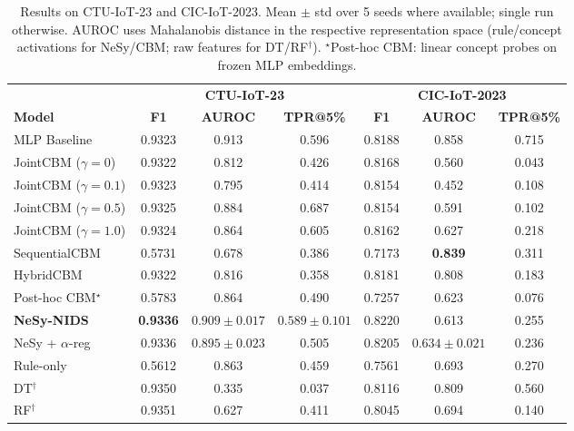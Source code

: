 \documentclass[journal]{IEEEtran}
\begin{document}
\begin{table}[!t]
\renewcommand{\arraystretch}{1.15}
\caption{Results on CTU-IoT-23 and CIC-IoT-2023. Mean $\pm$ std over 5
  seeds where available; single run otherwise. AUROC uses Mahalanobis
  distance in the respective representation space (rule/concept
  activations for NeSy/CBM; raw features for DT/RF$^\dagger$).
  $^\star$Post-hoc CBM: linear concept probes on frozen MLP embeddings.}
\label{tab:main}
\centering
\small
\begin{tabular}{lcccccc}
\toprule
& \multicolumn{3}{c}{\textbf{CTU-IoT-23}} &
  \multicolumn{3}{c}{\textbf{CIC-IoT-2023}} \\
\cmidrule(lr){2-4}\cmidrule(lr){5-7}
\textbf{Model} & \textbf{F1} & \textbf{AUROC} & \textbf{TPR@5\%} &
                 \textbf{F1} & \textbf{AUROC} & \textbf{TPR@5\%} \\
\midrule
MLP Baseline
  & 0.9323 & 0.913 & 0.596
  & 0.8188 & 0.858 & 0.715 \\
\midrule
JointCBM ($\gamma{=}0$)
  & 0.9322 & 0.812 & 0.426
  & 0.8168 & 0.560 & 0.043 \\
JointCBM ($\gamma{=}0.1$)
  & 0.9323 & 0.795 & 0.414
  & 0.8154 & 0.452 & 0.108 \\
JointCBM ($\gamma{=}0.5$)
  & 0.9325 & 0.884 & 0.687
  & 0.8154 & 0.591 & 0.102 \\
JointCBM ($\gamma{=}1.0$)
  & 0.9324 & 0.864 & 0.605
  & 0.8162 & 0.627 & 0.218 \\
SequentialCBM
  & 0.5731 & 0.678 & 0.386
  & 0.7173 & \textbf{0.839} & 0.311 \\
HybridCBM
  & 0.9322 & 0.816 & 0.358
  & 0.8181 & 0.808 & 0.183 \\
Post-hoc CBM$^\star$
  & 0.5783 & 0.864 & 0.490
  & 0.7257 & 0.623 & 0.076 \\
\midrule
\textbf{NeSy-NIDS}
  & \textbf{0.9336} & $\mathbf{0.909\pm0.017}$ & $0.589\pm0.101$
  & $\mathbf{0.8220}$ & 0.613 & 0.255 \\
NeSy + $\alpha$-reg
  & 0.9336 & $0.895\pm0.023$ & 0.505
  & 0.8205 & $0.634\pm0.021$ & 0.236 \\
Rule-only
  & 0.5612 & 0.863 & 0.459
  & 0.7561 & 0.693 & 0.270 \\
\midrule
DT$^\dagger$
  & 0.9350 & 0.335 & 0.037
  & 0.8116 & 0.809 & 0.560 \\
RF$^\dagger$
  & 0.9351 & 0.627 & 0.411
  & 0.8045 & 0.694 & 0.140 \\
\bottomrule
\end{tabular}
\end{table}
\end{document}
